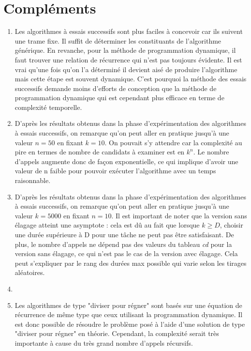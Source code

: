 \documentclass[a4paper, titlepage]{article}
\begin{document}
\section{Compléments}
\begin{enumerate}
\item
	Les algorithmes à essais successifs sont plus faciles à concevoir car ils suivent une trame fixe.
	Il suffit de déterminer les constituants de l'algorithme générique.
	En revanche, pour la méthode de programmation dynamique, il faut trouver une relation de récurrence qui n'est pas toujours évidente.
	Il est vrai qu'une fois qu'on l'a déterminé il devient aisé de produire l'algorithme mais cette étape est souvent dynamique.
	C'est pourquoi la méthode des essais successifs demande moins d'efforts de conception que la méthode de programmation dynamique qui est cependant plus efficace en terme de complexité temporelle.
\item
	D'après les résultats obtenus dans la phase d'expérimentation des algorithmes à essais successifs, on remarque qu'on peut aller en pratique jusqu'à une valeur $n = 50$ en fixant $k = 10$.
	On pouvait s'y attendre car la complexité au pire en termes de nombre de candidats à examiner est en $k^n$.
	Le nombre d'appels augmente donc de façon exponentielle, ce qui implique d'avoir une valeur de n faible pour pouvoir exécuter l'algorithme avec un temps raisonnable.
\item
	D'après les résultats obtenus dans la phase d'expérimentation des algorithmes à essais successifs, on remarque qu'on peut aller en pratique jusqu'à une valeur $k = 5000$ en fixant $n = 10$.
	Il est important de noter que la version sans élagage atteint une asymptote : cela est dû au fait que lorsque $k \ge D$, choisir une durée supérieure à D pour une tâche ne peut pas être satisfaisant.
	De plus, le nombre d'appels ne dépend pas des valeurs du tableau \emph{cd} pour la version sans élagage, ce qui n'est pas le cas de la version avec élagage.
	Cela peut s'expliquer par le rang des durées max possible qui varie selon les tirages aléatoires.
\item
\item
	Les algorithmes de type "diviser pour régner" sont basés sur une équation de récurrence de même type que ceux utilisant la programmation dynamique.
	Il est donc possible de résoudre le problème posé à l'aide d'une solution de type "diviser pour régner" en théorie.
	Cependant, la complexité serait très importante à cause du très grand nombre d'appels récursifs.
\end{enumerate}
\end{document}

